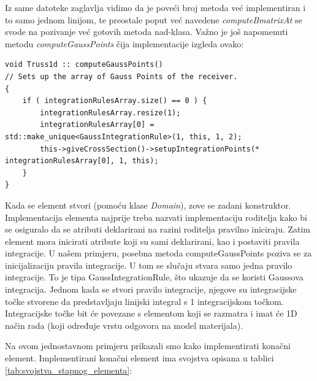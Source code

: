 \documentclass[a4paper,twoside,12pt]{memoir} %
\begin{document}
Iz same datoteke zaglavlja vidimo da je poveći broj metoda već implementiran i to samo jednom linijom, te preostale poput već navedene \textit{computeBmatrixAt} se svode na pozivanje već gotovih metoda nad-klasa. Važno je još napomenuti metodu \textit{computeGaussPoints} čija implementacije izgleda ovako:

\begin{lstlisting}[caption={Inicijalizacija integracijskog pravila za štapni element}]
void Truss1d :: computeGaussPoints()
// Sets up the array of Gauss Points of the receiver.
{
    if ( integrationRulesArray.size() == 0 ) {
        integrationRulesArray.resize(1);
        integrationRulesArray[0] = std::make_unique<GaussIntegrationRule>(1, this, 1, 2);
        this->giveCrossSection()->setupIntegrationPoints(* integrationRulesArray[0], 1, this);
    }
}
\end{lstlisting}

Kada se element stvori (pomoću klase \textit{Domain}), zove se zadani konstruktor. Implementacija elementa najprije treba nazvati implementaciju roditelja kako bi se osiguralo da se atributi deklarirani na razini roditelja pravilno iniciraju. Zatim element mora inicirati atribute koji su sami deklarirani, kao i postaviti pravila integracije. U našem primjeru, posebna metoda computeGaussPoints poziva se za inicijalizaciju pravila integracije. U tom se slučaju stvara samo jedna pravilo integracije. To je tipa GaussIntegrationRule, što ukazuje da se koristi Gaussova integracija. Jednom kada se stvori pravilo integracije, njegove su integracijske točke stvorene da predstavljaju linijski integral s 1 integracijskom točkom. Integracijske točke bit će povezane s elementom koji se razmatra i imat će 1D način rada (koji određuje vrstu odgovora na model materijala).

Na ovom jednostavnom primjeru prikazali smo kako implementirati konačni element. Implementirani konačni element ima svojstva opisana u tablici \ref{tab:svojstva_stapnog_elementa}:
\end{document}

